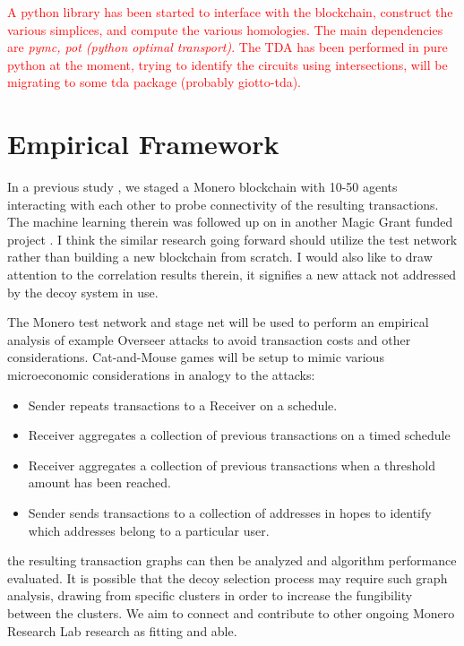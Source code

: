 \documentclass[prc, 12pt]{revtex4-1}
\begin{document}
\textcolor{red}{A python library has been started to interface with the blockchain, construct the various simplices, and compute the various homologies.  The main dependencies are \textit{pymc, pot (python optimal transport)}.  The TDA has been performed in pure python at the moment, trying to identify the circuits using intersections, will be migrating to some tda package (probably giotto-tda).}
  

\section{Empirical Framework}

In a previous study \cite{Borggren2020}, \cite{Borggren2020a} we staged a Monero blockchain with 10-50 agents interacting with each other to probe connectivity of the resulting transactions.  The machine learning therein was followed up on in another Magic Grant funded project \cite{jack}.  I think the similar research going forward should utilize the test network rather than building a new blockchain from scratch.  I would also like to draw attention to the correlation results therein, it signifies a new attack not addressed by the decoy system in use.  

The Monero test network and stage net will be used to perform an empirical analysis of example Overseer attacks to avoid transaction costs and other considerations.  Cat-and-Mouse games will be setup to mimic various microeconomic considerations in analogy to the attacks:

\begin{itemize}
	\item Sender repeats transactions to a Receiver on a schedule.
	\item Receiver aggregates a collection of previous transactions on a timed schedule 
	\item Receiver aggregates a collection of previous transactions when a threshold amount has been reached.
	\item Sender sends transactions to a collection of addresses in hopes to identify which addresses belong to a particular user.
\end{itemize}

the resulting transaction graphs can then be analyzed and algorithm performance evaluated.  It is possible that the decoy selection process may require such graph analysis, drawing from specific clusters in order to increase the fungibility between the clusters.  We aim to connect and contribute to other ongoing Monero Research Lab research as fitting and able.
\end{document}
